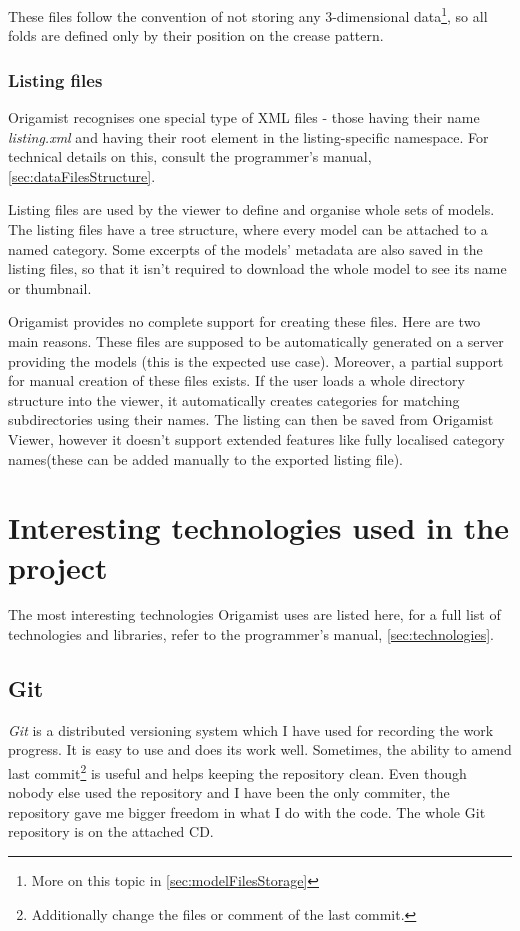 These files follow the convention of not storing any 3-dimensional data\footnote{More on this topic in \ref{sec:modelFilesStorage}}, so all
folds are defined only by their position on the crease pattern.

\subsubsection{Listing files}
Origamist recognises one special type of XML files - those having their name
\emph{listing.xml} and having their root element in the listing-specific namespace. For technical details on this, consult the programmer's manual, \ref{sec:dataFilesStructure}.

Listing files are used by the viewer to define and organise whole sets of models. The listing files have a tree structure, where every model can be attached to a named category. Some excerpts of the models' metadata are also saved in the listing files, so that it isn't required to download the whole model to see its name or thumbnail.

Origamist provides no complete support for creating these files. Here are two
main reasons. These files are supposed to be automatically generated on a server
providing the models (this is the expected use case).  Moreover, a partial support for manual creation of these files exists. If the user loads a whole directory structure into the viewer, it automatically creates categories for matching subdirectories using their names. The listing can then be saved from Origamist Viewer, however it doesn't support extended features like fully localised category names(these can be added manually to the exported listing file).

\section{Interesting technologies used in the project}
The most interesting technologies Origamist uses are listed here, for a full list of technologies and libraries, refer to the programmer's manual, \ref{sec:technologies}.
\subsection{Git}
\emph{Git} is a distributed versioning system which I have used for recording the work progress. It is easy to use and does its work well. Sometimes, the ability to amend last commit\footnote{Additionally change the files or comment of the last commit.} is useful and helps keeping the repository clean. Even though nobody else used the repository and I have been the only commiter, the repository gave me bigger freedom in what I do with the code. The whole Git repository is on the attached CD.
